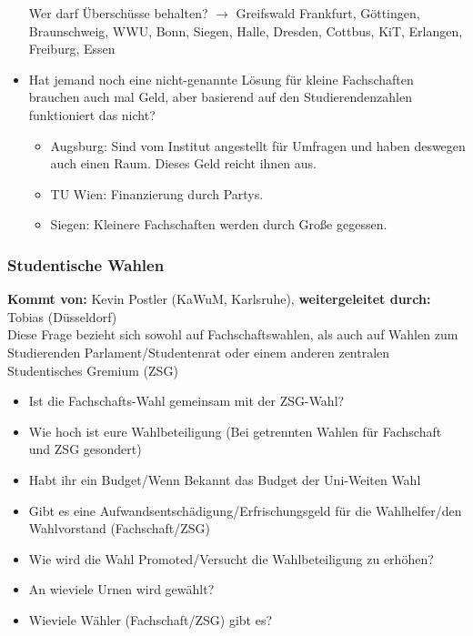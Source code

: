 \begin{itemize}
            Wer darf Überschüsse behalten? $\rightarrow$ Greifswald Frankfurt, Göttingen, Braunschweig, WWU, Bonn, Siegen, Halle, Dresden, Cottbus, KiT, Erlangen, Freiburg, Essen
          \item Hat jemand noch eine nicht-genannte Lösung für \flqq kleine Fachschaften brauchen auch mal Geld, aber basierend auf den Studierendenzahlen funktioniert das nicht\frqq?
            \begin{itemize}
              \item Augsburg: Sind vom Institut angestellt für Umfragen und haben deswegen auch einen Raum. Dieses Geld reicht ihnen aus.
              \item TU Wien: Finanzierung durch Partys.
              \item Siegen: Kleinere Fachschaften werden durch Große gegessen.
            \end{itemize}
        \end{itemize}

    \subsubsection*{Studentische Wahlen}
      \textbf{Kommt von:} Kevin Postler (KaWuM, Karlsruhe), \textbf{weitergeleitet durch:} Tobias (Düsseldorf) \\

Diese Frage bezieht sich sowohl auf Fachschaftswahlen, als auch auf Wahlen zum Studierenden Parlament/Studentenrat oder einem anderen zentralen Studentisches Gremium (ZSG)

\begin{itemize}
          \item Ist die Fachschafts-Wahl gemeinsam mit der ZSG-Wahl?
          \item Wie hoch ist eure Wahlbeteiligung (Bei getrennten Wahlen für Fachschaft und ZSG gesondert)
          \item Habt ihr ein Budget/Wenn Bekannt das Budget der Uni-Weiten Wahl
          \item Gibt es eine Aufwandsentschädigung/Erfrischungsgeld für die Wahlhelfer/den Wahlvorstand (Fachschaft/ZSG)
          \item Wie wird die Wahl Promoted/Versucht die Wahlbeteiligung zu erhöhen?
          \item An wieviele Urnen wird gewählt?
          \item Wieviele Wähler (Fachschaft/ZSG) gibt es?
        \end{itemize}

